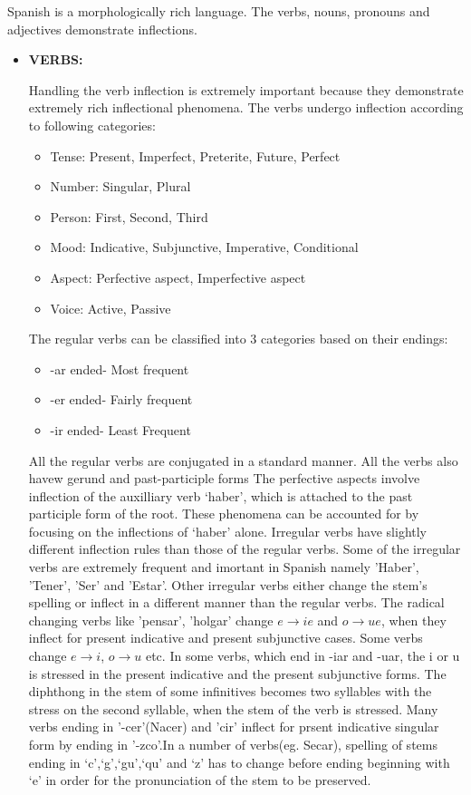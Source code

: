 \documentclass[11pt,letterpaper]{article}
\begin{document}
Spanish is a morphologically rich language. The verbs, nouns, pronouns and adjectives demonstrate inflections.
\begin{itemize}
\item
{\bf VERBS:}

Handling the verb inflection is extremely important because they demonstrate extremely rich inflectional phenomena.
The verbs undergo inflection according to following categories:
\begin{itemize}
\item
Tense: Present, Imperfect, Preterite, Future, Perfect
\item
Number: Singular, Plural
\item
Person: First, Second, Third
\item
Mood: Indicative, Subjunctive, Imperative, Conditional
\item
Aspect: Perfective aspect, Imperfective aspect
\item
Voice: Active, Passive
\end{itemize}

The regular verbs can be classified into 3 categories based on their endings:
\begin{itemize}
\item	-ar ended- Most frequent
\item	-er ended- Fairly frequent
\item	-ir ended- Least Frequent
\end{itemize}
All the regular verbs are conjugated in a standard manner. All the verbs also havew gerund and past-participle forms
The perfective aspects involve inflection of the auxilliary verb `haber', which is attached to the past participle form of the root. These phenomena can be accounted for by focusing on the inflections of `haber' alone.
Irregular verbs have slightly different inflection rules than those of the regular verbs. Some of the irregular verbs are extremely frequent and imortant in Spanish namely 'Haber', 'Tener', 'Ser' and 'Estar'.
Other irregular verbs either change the stem's spelling or inflect in a different manner than the regular verbs. The radical changing verbs like 'pensar', 'holgar' change $e \rightarrow ie$ and $o \rightarrow ue$, when they inflect for present indicative and present subjunctive cases. Some verbs change $e \rightarrow i$, $o \rightarrow u$ etc. In some verbs, which end in -iar and -uar, the i or u is stressed in the present indicative and the present subjunctive forms. The diphthong in the stem of some infinitives becomes two syllables with the stress on the second syllable, when the stem of the verb is stressed. Many verbs ending in '-cer'(Nacer) and 'cir' inflect for prsent indicative singular form by ending in '-zco'.In a number of verbs(eg. Secar), spelling of stems ending in `c',`g',`gu',`qu' and `z' has to change before ending beginning with `e' in order for the pronunciation of the stem to be preserved.


\end{itemize}
\end{document}
